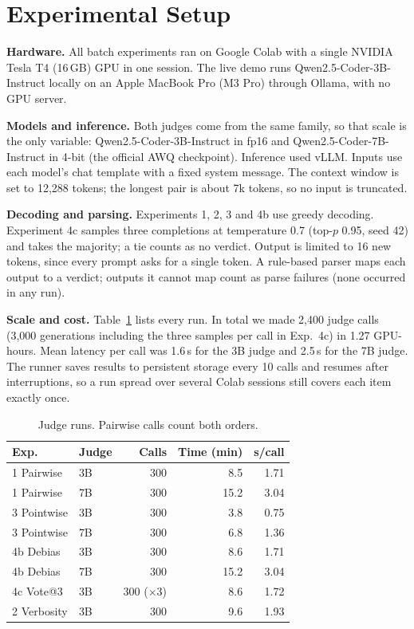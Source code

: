 \section{Experimental Setup}
\textbf{Hardware.} All batch experiments ran on Google Colab with a single NVIDIA Tesla T4 (16\,GB) GPU in one session. The live demo runs Qwen2.5-Coder-3B-Instruct locally on an Apple MacBook Pro (M3 Pro) through Ollama, with no GPU server.

\textbf{Models and inference.} Both judges come from the same family, so that scale is the only variable: Qwen2.5-Coder-3B-Instruct in fp16 and Qwen2.5-Coder-7B-Instruct in 4-bit (the official AWQ checkpoint). Inference used vLLM. Inputs use each model's chat template with a fixed system message. The context window is set to 12{,}288 tokens; the longest pair is about 7k tokens, so no input is truncated.

\textbf{Decoding and parsing.} Experiments 1, 2, 3 and 4b use greedy decoding. Experiment 4c samples three completions at temperature 0.7 (top-$p$ 0.95, seed 42) and takes the majority; a tie counts as no verdict. Output is limited to 16 new tokens, since every prompt asks for a single token. A rule-based parser maps each output to a verdict; outputs it cannot map count as parse failures (none occurred in any run).

\textbf{Scale and cost.} Table~\ref{tab:runs} lists every run. In total we made 2{,}400 judge calls (3{,}000 generations including the three samples per call in Exp.~4c) in 1.27 GPU-hours. Mean latency per call was 1.6\,s for the 3B judge and 2.5\,s for the 7B judge. The runner saves results to persistent storage every 10 calls and resumes after interruptions, so a run spread over several Colab sessions still covers each item exactly once.

\begin{table}[t]
\centering
\caption{Judge runs. Pairwise calls count both orders.}
\label{tab:runs}
\begin{tabular}{llrrr}
\toprule
Exp. & Judge & Calls & Time (min) & s/call \\
\midrule
1 Pairwise       & 3B & 300 & 8.5 & 1.71 \\
1 Pairwise       & 7B & 300 & 15.2 & 3.04 \\
3 Pointwise      & 3B & 300 & 3.8 & 0.75 \\
3 Pointwise      & 7B & 300 & 6.8 & 1.36 \\
4b Debias        & 3B & 300 & 8.6 & 1.71 \\
4b Debias        & 7B & 300 & 15.2 & 3.04 \\
4c Vote@3        & 3B & 300 ($\times$3) & 8.6 & 1.72 \\
2 Verbosity      & 3B & 300 & 9.6 & 1.93 \\
\bottomrule
\end{tabular}
\end{table}
